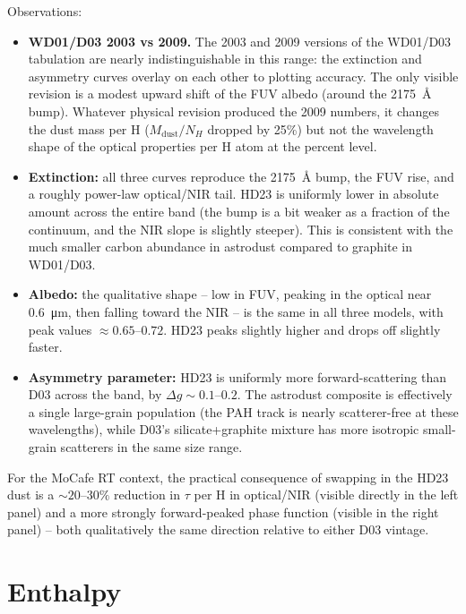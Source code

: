 \documentclass{my_memo}
\begin{document}
Observations:
\begin{itemize}
  \item \textbf{WD01/D03 2003 vs 2009.} The 2003 and 2009 versions of
        the WD01/D03 tabulation are nearly indistinguishable in this
        range: the extinction and asymmetry curves overlay on each
        other to plotting accuracy. The only visible revision is a
        modest upward shift of the FUV albedo (around the
        \SI{2175}{\angstrom} bump). Whatever physical revision
        produced the 2009 numbers, it changes the dust mass per H
        ($M_\mathrm{dust}/N_H$ dropped by 25\%) but not the wavelength
        shape of the optical properties per H atom at the percent level.
  \item \textbf{Extinction:} all three curves reproduce the
        \SI{2175}{\angstrom} bump, the FUV rise, and a roughly
        power-law optical/NIR tail. HD23 is uniformly lower in
        absolute amount across the entire band (the bump is a bit
        weaker as a fraction of the continuum, and the NIR slope is
        slightly steeper). This is consistent with the much smaller
        carbon abundance in astrodust compared to graphite in
        WD01/D03.
  \item \textbf{Albedo:} the qualitative shape -- low in FUV,
        peaking in the optical near \SI{0.6}{\micro\meter}, then
        falling toward the NIR -- is the same in all three models,
        with peak values $\approx 0.65$--$0.72$. HD23 peaks slightly
        higher and drops off slightly faster.
  \item \textbf{Asymmetry parameter:} HD23 is uniformly more
        forward-scattering than D03 across the band, by
        $\Delta g \sim 0.1$--$0.2$. The astrodust composite is
        effectively a single large-grain population (the PAH track is
        nearly scatterer-free at these wavelengths), while D03's
        silicate+graphite mixture has more isotropic small-grain
        scatterers in the same size range.
\end{itemize}

For the MoCafe RT context, the practical consequence of swapping in
the HD23 dust is a $\sim 20$--$30\%$ reduction in $\tau$ per H in
optical/NIR (visible directly in the left panel) and a more strongly
forward-peaked phase function (visible in the right panel) -- both
qualitatively the same direction relative to either D03 vintage.


\section{Enthalpy}
\end{document}
